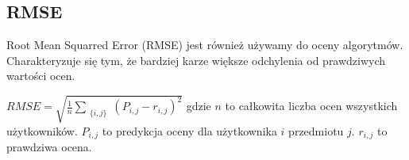 \documentclass[12pt, a4paper]{article}
\begin{document}
\subsection{RMSE}
Root Mean Squarred Error (RMSE) jest również używamy do oceny algorytmów. Charakteryzuje się tym, że bardziej karze większe odchylenia od prawdziwych wartości ocen.

\begin{math}
RMSE = \sqrt{
	\frac{1}{n} \sum_{ \substack{
		\{i,j\}
	} }
	(P_{i,j} - r_{i,j})^2
}
\end{math}
gdzie $n$ to całkowita liczba ocen wszystkich użytkowników. $P_{i,j}$ to predykcja oceny dla użytkownika $i$ przedmiotu $j$. $r_{i,j}$ to prawdziwa ocena.

\nocite{*}


\end{document}
